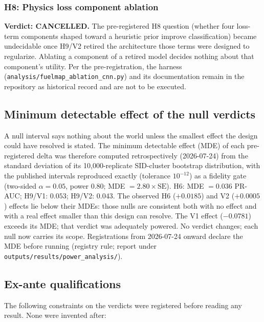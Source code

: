\documentclass[11pt]{article}
\begin{document}
\subsubsection*{H8: Physics loss component ablation}

\textbf{Verdict: CANCELLED.} The pre-registered H8 question (whether four
loss-term components shaped toward a heuristic prior improve classification)
became undecidable once H9/V2 retired the architecture those terms were
designed to regularize. Ablating a component of a retired model decides nothing
about that component's utility. Per the pre-registration, the harness
(\texttt{analysis/fuelmap\_ablation\_cnn.py}) and its documentation remain in
the repository as historical record and are not to be executed.

\subsection{Minimum detectable effect of the null verdicts}
\label{subsec:mde}

A null interval says nothing about the world unless the smallest effect the
design could have resolved is stated. The minimum detectable effect (MDE) of
each pre-registered delta was therefore computed retrospectively (2026-07-24)
from the standard deviation of its 10{,}000-replicate SID-cluster bootstrap
distribution, with the published intervals reproduced exactly (tolerance
$10^{-12}$) as a fidelity gate (two-sided $\alpha = 0.05$, power $0.80$;
MDE $= 2.80 \times \mathrm{SE}$). H6: MDE $= 0.036$ PR-AUC; H9/V1: $0.053$;
H9/V2: $0.043$. The observed H6 ($+0.0185$) and V2 ($+0.0005$) effects lie
below their MDEs: those nulls are consistent both with no effect and with a
real effect smaller than this design can resolve. The V1 effect ($-0.0781$)
exceeds its MDE; that verdict was adequately powered. No verdict changes; each
null now carries its scope. Registrations from 2026-07-24 onward declare the
MDE before running (registry rule; report under
\texttt{outputs/results/power\_analysis/}).

\subsection{Ex-ante qualifications}

The following constraints on the verdicts were registered before reading any
result. None were invented after:
\end{document}
